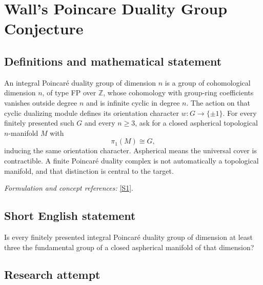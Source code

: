 \documentclass[11pt,a4paper]{article}
\newcommand{\Z}{\mathbb{Z}}
\newcommand{\sref}[2]{\hyperlink{source:#1:#2}{[S#2]}}
\newif\ifshowcatalogue
\newcommand{\cataloguescope}[1]{\ifshowcatalogue
 \paragraph{Exact scope in the supplied catalogue.}
 \begin{quote}\small #1\end{quote}\fi}
\numberwithin{equation}{section}
\begin{document}
\setcounter{section}{0}
\clearpage
\section*{\texorpdfstring{Wall's Poincare Duality Group Conjecture}{Wall's Poincare Duality Group Conjecture}}\label{statement}
\subsection{Definitions and mathematical statement}
An integral Poincar\'e duality group of dimension $n$ is a group of cohomological dimension $n$, of type FP over $\Z$, whose cohomology with group-ring coefficients vanishes outside degree $n$ and is infinite cyclic in degree $n$. The action on that cyclic dualizing module defines its orientation character $w:G\to\{\pm1\}$. For every finitely presented such $G$ and every $n\ge3$, ask for a closed aspherical topological $n$-manifold $M$ with
\[
 \pi_1(M)\cong G,
\]
inducing the same orientation character. Aspherical means the universal cover is contractible. A finite Poincar\'e duality complex is not automatically a topological manifold, and that distinction is central to the target.
\par\smallskip\textit{Formulation and concept references:} \sref{statement}{1}.
\cataloguescope{For every n\ensuremath{\ge}3 and every finitely presented integral Poincaré duality group G of dimension n, prove that there is a closed aspherical topological n-manifold M with \ensuremath{\pi}1(M)\ensuremath{\cong}G and matching orientation character.}
\subsection{Short English statement}
Is every finitely presented integral Poincaré duality group of dimension at least three the fundamental group of a closed aspherical manifold of that dimension?
\subsection{Research attempt}
\end{document}
